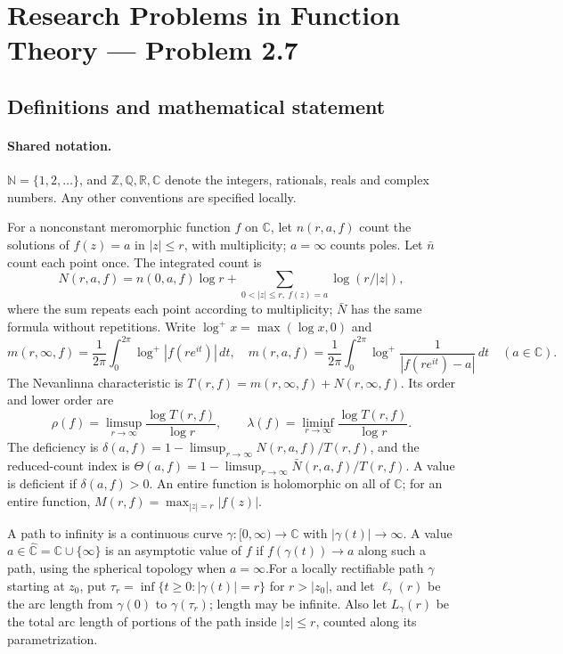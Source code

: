 \documentclass[11pt]{article}
\begin{document}
\section{Research Problems in Function Theory — Problem 2.7}\label{statement}

\subsection{Definitions and mathematical statement}

\paragraph{Shared notation.}$\mathbb N=\{1,2,\ldots\}$, and $\mathbb Z,\mathbb Q,\mathbb R,\mathbb C$ denote the integers, rationals, reals and complex numbers. Any other conventions are specified locally.


For a nonconstant meromorphic function $f$ on $\mathbb C$, let $n(r,a,f)$ count the solutions of $f(z)=a$ in $|z|\le r$, with multiplicity; $a=\infty$ counts poles. Let $\bar n$ count each point once. The integrated count is
\[
 N(r,a,f)=n(0,a,f)\log r+\sum_{0<|z|\le r,\ f(z)=a}\log(r/|z|),
\]
where the sum repeats each point according to multiplicity; $\bar N$ has the same formula without repetitions. Write $\log^+x=\max(\log x,0)$ and
\[
 m(r,\infty,f)=\frac1{2\pi}\int_0^{2\pi}\log^+|f(re^{it})|\,dt,\quad
 m(r,a,f)=\frac1{2\pi}\int_0^{2\pi}\log^+\frac1{|f(re^{it})-a|}\,dt\quad(a\in\mathbb C).
\]
The Nevanlinna characteristic is $T(r,f)=m(r,\infty,f)+N(r,\infty,f)$. Its order and lower order are
\[
 \rho(f)=\limsup_{r\to\infty}\frac{\log T(r,f)}{\log r},\qquad
 \lambda(f)=\liminf_{r\to\infty}\frac{\log T(r,f)}{\log r}.
\]
The deficiency is $\delta(a,f)=1-\limsup_{r\to\infty}N(r,a,f)/T(r,f)$, and the reduced-count index is $\Theta(a,f)=1-\limsup_{r\to\infty}\bar N(r,a,f)/T(r,f)$. A value is deficient if $\delta(a,f)>0$. An entire function is holomorphic on all of $\mathbb C$; for an entire function, $M(r,f)=\max_{|z|=r}|f(z)|$.

A path to infinity is a continuous curve $\gamma:[0,\infty)\to\mathbb C$ with $|\gamma(t)|\to\infty$. A value $a\in\widehat{\mathbb C}=\mathbb C\cup\{\infty\}$ is an asymptotic value of $f$ if $f(\gamma(t))\to a$ along such a path, using the spherical topology when $a=\infty$.For a locally rectifiable path $\gamma$ starting at $z_0$, put $\tau_r=\inf\{t\ge0:|\gamma(t)|=r\}$ for $r>|z_0|$, and let $\ell_\gamma(r)$ be the arc length from $\gamma(0)$ to $\gamma(\tau_r)$; length may be infinite. Also let $L_\gamma(r)$ be the total arc length of portions of the path inside $|z|\le r$, counted along its parametrization.
\end{document}
